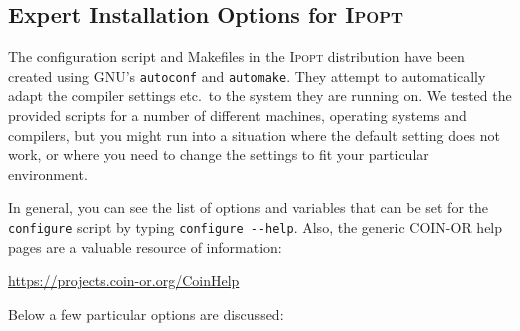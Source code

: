 \documentclass[10pt]{article}
\newcommand{\Ipopt}{\textsc{Ipopt}\xspace}
\newcommand{\Matlab}{\textsc{MATLAB}\xspace}
\begin{document}



\subsection{Expert Installation Options for \Ipopt}\label{ExpertInstall}

The configuration script and Makefiles in the \Ipopt distribution
have been created using GNU's {\tt autoconf} and {\tt automake}.  They
attempt to automatically adapt the compiler settings etc.\ to the
system they are running on.  We tested the provided scripts for a
number of different machines, operating systems and compilers, but you
might run into a situation where the default setting does not work, or
where you need to change the settings to fit your particular
environment.

In general, you can see the list of options and variables that can be
set for the {\tt configure} script by typing \verb/configure --help/.
Also, the generic COIN-OR help pages are a valuable resource of
information:

\centerline{\url{https://projects.coin-or.org/CoinHelp}}

Below a few particular options are discussed:
\end{document}
